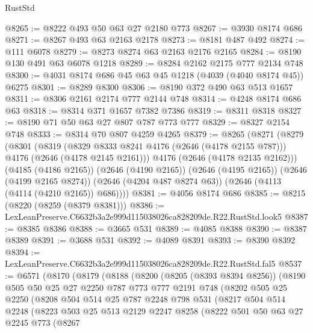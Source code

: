 \begin{lexlean}{RustStd}
\begin{coremodule}
@8265 := @8222 @493 @50 @63 @27 @2180 @773
@8267 := @3930 @8174 @686
@8271 := @8267 @493 @63 @2163 @2178
@8273 := @8181 @487 @492
@8274 := @111 @6078
@8279 := @8273 @8274 @63 @2163 @2176 @2165
@8284 := @8190 @130 @491 @63 @6078 @1218
@8289 := @8284 @2162 @2175 @777 @2134 @748
@8300 := @4031 @8174 @686 @45 @63 @45 @1218 (@4039 (@4040 @8174 @45)) @6275
@8301 := @8289 @8300
@8306 := @8190 @372 @490 @63 @513 @1657
@8311 := @8306 @2161 @2174 @777 @2144 @748
@8314 := @4248 @8174 @686 @63
@8318 := @8314 @371 @1657 @7382 @7386
@8319 := @8311 @8318
@8327 := @8190 @71 @50 @63 @27 @807 @787 @773 @777
@8329 := @8327 @2154 @748
@8333 := @8314 @70 @807 @4259 @4265
@8379 := @8265
    (@8271
      (@8279
        (@8301
          (@8319
            (@8329 @8333 @8241 @4176 (@2646 (@4178 @2155 @787)))
            @4176
            (@2646 (@4178 @2145 @2161)))
          @4176
          (@2646 (@4178 @2135 @2162)))
        (@4185 (@4186 @2165))
        (@2646 (@4190 @2165))
        (@2646 (@4195 @2165))
        (@2646 (@4199 @2165 @8274))
        (@2646 (@4204 @487 @8274 @63))
        (@2646 (@4113 (@4114 (@4210 @2165)) @686))))
@8381 := @4056 @8174 @686
@8385 := @8215 (@8220 (@8259 (@8379 @8381)))
@8386 := LexLeanPreserve.C6632b3a2e999d115038026ca828209de.R22.RustStd.look5
@8387 := @8385 @8386
@8388 := @3665 @531
@8389 := @4085 @8388
@8390 := @8387 @8389
@8391 := @3688 @531
@8392 := @4089 @8391
@8393 := @8390 @8392
@8394 := LexLeanPreserve.C6632b3a2e999d115038026ca828209de.R22.RustStd.fal5
@8537 := @6571
    (@8170
      (@8179
        (@8188
          (@8200
            (@8205 (@8393 @8394 @8256))
            (@8190
              @505
              @50
              @25
              @27
              @2250
              @787
              @773
              @777
              @2191
              @748
              (@8202
                @505
                @25
                @2250
                (@8208
                  @504
                  @514
                  @25
                  @787
                  @2248
                  @798
                  @531
                  (@8217
                    @504
                    @514
                    @2248
                    (@8223
                      @503
                      @25
                      @513
                      @2129
                      @2247
                      @8258
                      (@8222
                        @501
                        @50
                        @63
                        @27
                        @2245
                        @773
                        (@8267

\end{coremodule}
\end{lexlean}
